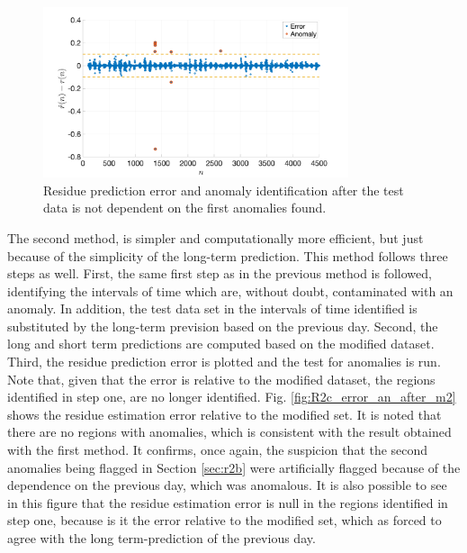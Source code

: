 \documentclass[]{scrartcl}
\begin{document}
\begin{figure}[htbp]
	\centering
	\includegraphics[width= 0.8\textwidth]{figures/R2c_error_an_after.png}
	\caption{Residue prediction error and anomaly identification after the test data is not dependent on the first anomalies found.}
	\label{fig:R2c_error_an_after}
\end{figure}

The second method, is simpler and computationally more efficient, but just because of the simplicity of the long-term prediction. This method follows three steps as well. First, the same first step as in the previous method is followed, identifying the intervals of time which are, without doubt, contaminated with an anomaly. In addition, the test data set in the intervals of time identified is substituted by the long-term prevision based on the previous day. Second, the long and short term predictions are computed based on the modified dataset. Third, the residue prediction error is plotted and the test for anomalies is run. Note that, given that the error is relative to the modified dataset, the regions identified in step one, are no longer identified. Fig. \ref{fig:R2c_error_an_after_m2} shows the residue estimation error relative to the modified set. It is noted that there are no regions with anomalies, which is consistent with the result obtained with the first method. It confirms, once again, the suspicion that the second anomalies being flagged in Section \ref{sec:r2b} were artificially flagged because of the dependence on the previous day, which was anomalous. It is also possible to see in this figure that the residue estimation error is null in the regions identified in step one, because is it the error relative to the modified set, which as forced to agree with the long term-prediction of the previous day.
\end{document}
